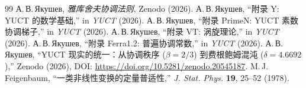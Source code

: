 \documentclass[12pt,a4paper]{article}
\begin{document}
	\begin{thebibliography}{99}
		 А.\,В.\,Якушев, \emph{雅库舍夫协调法则}, Zenodo (2026).
		 А.\,В.\,Якушев, ``附录 Y: YUCT 的数学基础,'' in \emph{YUCT} (2026).
		 А.\,В.\,Якушев, ``附录 PrimeN: YUCT 素数协调梯子,'' in \emph{YUCT} (2026).
		 А.\,В.\,Якушев, ``附录 VT: 涡旋理论,'' in \emph{YUCT} (2026).
		 А.\,В.\,Якушев, ``附录 Ferra1.2: 普遍协调常数,'' in \emph{YUCT} (2026).
		 А.\,В.\,Якушев, ``YUCT 现实的统一：从协调秩序 ($\beta=2/3$) 到费根鲍姆混沌 ($\delta=4.6692$),'' Zenodo (2026), DOI: \url{https://doi.org/10.5281/zenodo.20545187}.
		 M.\,J.\,Feigenbaum, ``一类非线性变换的定量普适性,'' \emph{J. Stat. Phys.} \textbf{19}, 25--52 (1978).
	\end{thebibliography}
	
\end{document}
